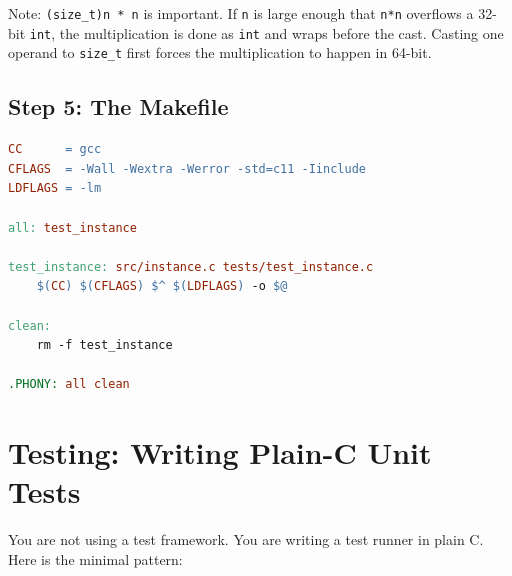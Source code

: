 Note: \texttt{(size\_t)n * n} is important. If \texttt{n} is large enough that \texttt{n*n} overflows a 32-bit \texttt{int}, the multiplication is done as \texttt{int} and wraps before the cast. Casting one operand to \texttt{size\_t} first forces the multiplication to happen in 64-bit.

\subsection{Step 5: The Makefile}

\begin{lstlisting}[style=cstyle, language=make]
CC      = gcc
CFLAGS  = -Wall -Wextra -Werror -std=c11 -Iinclude
LDFLAGS = -lm

all: test_instance

test_instance: src/instance.c tests/test_instance.c
	$(CC) $(CFLAGS) $^ $(LDFLAGS) -o $@

clean:
	rm -f test_instance

.PHONY: all clean
\end{lstlisting}

\newpage

\section{Testing: Writing Plain-C Unit Tests}

You are not using a test framework. You are writing a test runner in plain C. Here is the minimal pattern:

